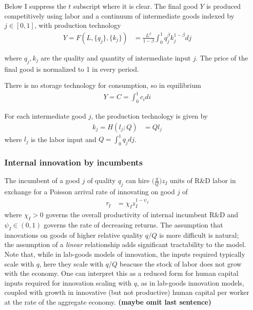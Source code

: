 \documentclass[12pt,english]{article}
\theoremstyle{remark}
\begin{document}
Below I suppress the $t$ subscript where it is clear. The final good $Y$ is produced competitively using labor and a continuum of intermediate goods indexed by $j \in [0,1]$, with production technology
\begin{align*}
Y = F(L,\{q_j\},\{k_j\}) &= \frac{L^{\beta}}{1-\beta} \int_0^1 q_j^{\beta} k_j^{1-\beta} dj
\end{align*}

where $q_j,k_j$ are the quality and quantity of intermediate input $j$. The price of the final good is normalized to 1 in every period.

There is no storage technology for consumption, so in equilibrium
\begin{align*}
Y = C = \int_0^1 c_i di
\end{align*}

For each intermediate good $j$, the production technology is given by
\begin{align*}
k_j = H(l_j;Q) &= Q l_j
\end{align*}
where $l_j$ is the labor input and $Q = \int_0^1 q_j dj$. 



\subsubsection{Internal innovation by incumbents}

The incumbent of a good $j$ of quality $q_j$ can hire $\big(\frac{q}{Q}\big)z_I$ units of R\&D labor in exchange for a Poisson arrival rate of innovating on good $j$ of
\begin{align}
\tau_I &= \chi_I z_I^{1-\psi_I}  \label{incumbent_innovation_rate}
\end{align}
where $\chi_I > 0$ governs the overall productivity of internal incumbent R\&D and $\psi_I \in (0,1)$ governs the rate of decreasing returns. The assumption that innovations on goods of higher relative quality $q/Q$ is more difficult is natural; the assumption of a \textit{linear} relationship adds significant tractability to the model. Note that, while in lab-goods models of innovation, the inputs required typically scale with $q$, here they scale with $q/Q$ beacuse the stock of labor does not grow with the economy. One can interpret this as a reduced form for human capital inputs required for innovation scaling with $q$, as in lab-goods innovation models, coupled with growth in innovative (but not productive) human capital per worker at the rate of the aggregate economy. \textbf{(maybe omit last sentence)}
\end{document}
